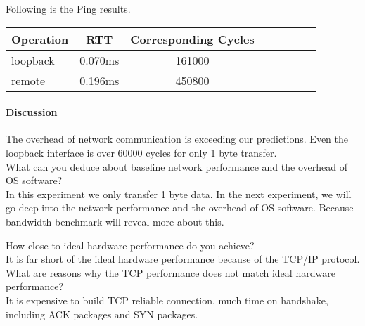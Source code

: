 Following is the Ping results.
\begin{center}
\begin{tabular}{l*{6}{c}r}
Operation       &  RTT & Corresponding Cycles\\
\hline
loopback & 0.070ms & 161000 \\
remote & 0.196ms &  450800 \\
\end{tabular}
\end{center}

\paragraph{Discussion}
The overhead of network communication is exceeding our predictions. Even the loopback interface is over 60000 cycles for only 1 byte transfer. \\


What can you deduce about baseline network performance and the overhead of OS software?  \\
In this experiment we only transfer 1 byte data. In the next experiment, we will go deep into the network performance and the overhead of OS software. Because bandwidth benchmark will reveal more about this.

How close to ideal hardware performance do you achieve? \\ 
It is far short of the ideal hardware performance because of the TCP/IP protocol.\\


What are reasons why the TCP performance does not match ideal hardware performance?  \\
It is expensive to build TCP reliable connection, much time on handshake, including ACK packages and SYN packages.

